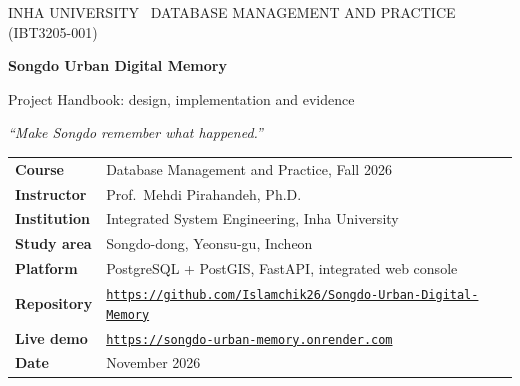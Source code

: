 \documentclass[11pt,a4paper]{article}
\newcommand{\LiveURL}{https://songdo-urban-memory.onrender.com}
\newcommand{\RepoURL}{https://github.com/Islamchik26/Songdo-Urban-Digital-Memory}
\newcommand{\HandbookDate}{November 2026}
\begin{document}
\begin{titlepage}
\thispagestyle{empty}
\vspace*{0.2cm}
{\color{white}\small INHA UNIVERSITY \textbullet\ DATABASE MANAGEMENT AND PRACTICE (IBT3205-001)\par}
\vspace{0.8cm}
{\color{white}\fontsize{26}{32}\selectfont\bfseries Songdo Urban Digital Memory\par}
\vspace{0.3cm}
{\color{white}\Large Project Handbook: design, implementation and evidence\par}
\vspace{2.0cm}
{\Large\itshape ``Make Songdo remember what happened.''\par}
\vspace{1.0cm}

\begin{tabularx}{\linewidth}{@{}>{\bfseries}p{3.4cm}X@{}}
Course        & Database Management and Practice, Fall 2026 \\
Instructor    & Prof.\ Mehdi Pirahandeh, Ph.D. \\
Institution   & Integrated System Engineering, Inha University \\
Study area    & Songdo-dong, Yeonsu-gu, Incheon \\
Platform      & PostgreSQL + PostGIS, FastAPI, integrated web console \\
Repository    & \href{\RepoURL}{\texttt{\RepoURL}} \\
Live demo     & \href{\LiveURL}{\texttt{\LiveURL}} \\
Date          & \HandbookDate \\
\end{tabularx}


\end{titlepage}
\end{document}
